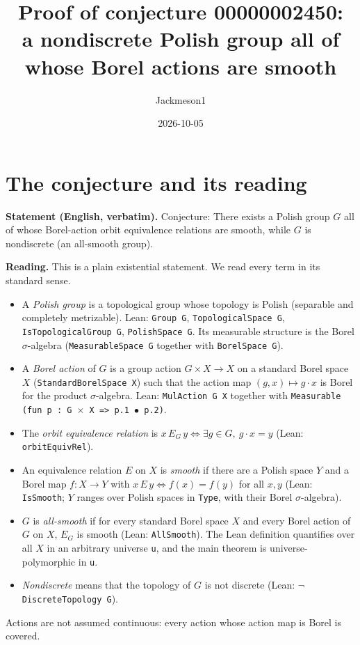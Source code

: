 \documentclass[11pt]{article}
\title{Proof of conjecture 00000002450:\\ a nondiscrete Polish group all of whose Borel actions are smooth}
\author{Jackmeson1}
\date{2026-10-05}
\theoremstyle{definition}
\begin{document}
\maketitle

\section{The conjecture and its reading}

\textbf{Statement (English, verbatim).} Conjecture: There exists a Polish group $G$ all of whose
Borel-action orbit equivalence relations are smooth, while $G$ is nondiscrete (an all-smooth group).

\textbf{Reading.} This is a plain existential statement. We read every term in its standard sense.
\begin{itemize}
\item A \emph{Polish group} is a topological group whose topology is Polish (separable and
  completely metrizable). Lean: \texttt{Group G}, \texttt{TopologicalSpace G},
  \texttt{IsTopologicalGroup G}, \texttt{PolishSpace G}. Its measurable structure is the Borel
  $\sigma$-algebra (\texttt{MeasurableSpace G} together with \texttt{BorelSpace G}).
\item A \emph{Borel action} of $G$ is a group action $G\times X\to X$ on a standard Borel space $X$
  (\texttt{StandardBorelSpace X}) such that the action map $(g,x)\mapsto g\cdot x$ is Borel for the
  product $\sigma$-algebra. Lean: \texttt{MulAction G X} together with
  \texttt{Measurable (fun p : G $\times$ X => p.1 $\bullet$ p.2)}.
\item The \emph{orbit equivalence relation} is $x\,E_G\,y \iff \exists g\in G,\ g\cdot x=y$
  (Lean: \texttt{orbitEquivRel}).
\item An equivalence relation $E$ on $X$ is \emph{smooth} if there are a Polish space $Y$ and a Borel
  map $f:X\to Y$ with $x\,E\,y\iff f(x)=f(y)$ for all $x,y$ (Lean: \texttt{IsSmooth}; $Y$ ranges over
  Polish spaces in \texttt{Type}, with their Borel $\sigma$-algebra).
\item $G$ is \emph{all-smooth} if for every standard Borel space $X$ and every Borel action of $G$ on
  $X$, $E_G$ is smooth (Lean: \texttt{AllSmooth}). The Lean definition quantifies over all
  $X$ in an arbitrary universe \texttt{u}, and the main theorem is universe-polymorphic in \texttt{u}.
\item \emph{Nondiscrete} means that the topology of $G$ is not discrete (Lean:
  \texttt{$\neg$ DiscreteTopology G}).
\end{itemize}
Actions are not assumed continuous: every action whose action map is Borel is covered.
\end{document}
